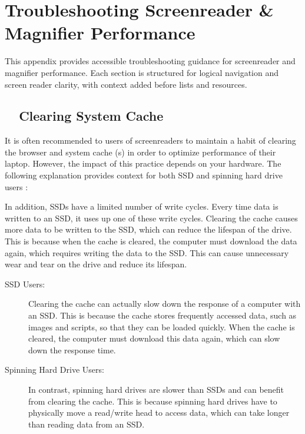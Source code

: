 \chapter{Troubleshooting Screenreader \& Magnifier Performance}
\label{app1:troubleshooting}

\begin{raggedright}
	This appendix provides accessible troubleshooting guidance for screenreader and magnifier performance. Each section is structured for logical navigation and screen reader clarity, with context added before lists and resources.
\end{raggedright}

\section{~~Clearing System Cache}
\label{app1:cache}
It is often recommended to users of screenreaders to maintain a habit of clearing the browser and system cache (s) in order to optimize performance of their laptop. However, the impact of this practice depends on your hardware. The following explanation provides context for both SSD and spinning hard drive users \cite{SystemOptimizationGuides, Microsoft2023WindowsPerformance}:

In addition, SSDs have a limited number of write cycles. Every time data is written to an SSD, it uses up one of these write cycles. Clearing the cache causes more data to be written to the SSD, which can reduce the lifespan of the drive. This is because when the cache is cleared, the computer must download the data again, which requires writing the data to the SSD. This can cause unnecessary wear and tear on the drive and reduce its lifespan.

\begin{description}
	\item[SSD Users:] Clearing the cache can actually slow down the response of a computer with an SSD. This is because the cache stores frequently accessed data, such as images and scripts, so that they can be loaded quickly. When the cache is cleared, the computer must download this data again, which can slow down the response time.
	\item[Spinning Hard Drive Users:] In contrast, spinning hard drives are slower than SSDs and can benefit from clearing the cache. This is because spinning hard drives have to physically move a read/write head to access data, which can take longer than reading data from an SSD.
\end{description}

